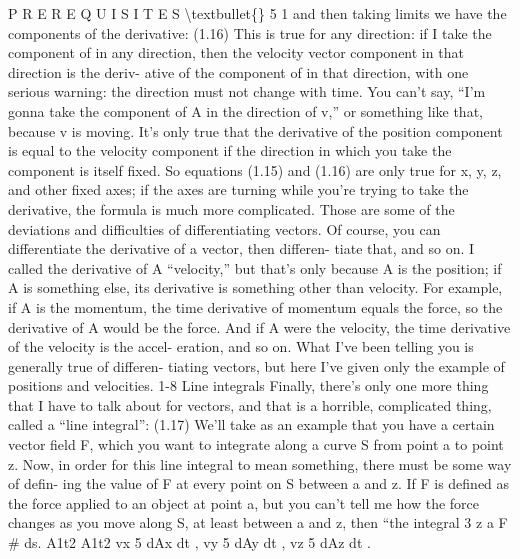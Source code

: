 \documentclass[10pt,oneside]{article}
\begin{document}
P R E R E Q U I S I T E S \textbackslash{}textbullet\{\} 5 1 and then taking limits we have the components of the derivative: (1.16) This is true for any direction: if I take the component of in any direction, then the velocity vector component in that direction is the deriv- ative of the component of in that direction, with one serious warning: the direction must not change with time. You can’t say, “I’m gonna take the component of A in the direction of v,” or something like that, because v is moving. It’s only true that the derivative of the position component is equal to the velocity component if the direction in which you take the component is itself fixed. So equations (1.15) and (1.16) are only true for x, y, z, and other fixed axes; if the axes are turning while you’re trying to take the derivative, the formula is much more complicated. Those are some of the deviations and difficulties of differentiating vectors. Of course, you can differentiate the derivative of a vector, then differen- tiate that, and so on. I called the derivative of A “velocity,” but that’s only because A is the position; if A is something else, its derivative is something other than velocity. For example, if A is the momentum, the time derivative of momentum equals the force, so the derivative of A would be the force. And if A were the velocity, the time derivative of the velocity is the accel- eration, and so on. What I’ve been telling you is generally true of differen- tiating vectors, but here I’ve given only the example of positions and velocities. 1-8 Line integrals Finally, there’s only one more thing that I have to talk about for vectors, and that is a horrible, complicated thing, called a “line integral”: (1.17) We’ll take as an example that you have a certain vector field F, which you want to integrate along a curve S from point a to point z. Now, in order for this line integral to mean something, there must be some way of defin- ing the value of F at every point on S between a and z. If F is defined as the force applied to an object at point a, but you can’t tell me how the force changes as you move along S, at least between a and z, then “the integral 3 z a F \# ds. A1t2 A1t2 vx 5 dAx dt , vy 5 dAy dt , vz 5 dAz dt .\par
\end{document}
